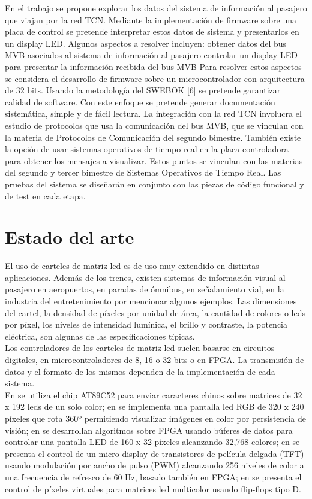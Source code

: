 En el trabajo se propone explorar los datos del sistema de información al pasajero que viajan por
la red TCN. Mediante la implementación de firmware sobre una placa de control se pretende
interpretar estos datos de sistema y presentarlos en un display LED. Algunos aspectos a resolver
incluyen:
obtener datos del bus MVB asociados al sistema de información al pasajero
controlar un display LED para presentar la información recibida del bus MVB
Para resolver estos aspectos se considera el desarrollo de firmware sobre un microcontrolador
con arquitectura de 32 bits. Usando la metodología del SWEBOK [6] se pretende garantizar
calidad de software. Con este enfoque se pretende generar documentación sistemática, simple y
de fácil lectura. La integración con la red TCN involucra el estudio de protocolos que usa la
comunicación del bus MVB, que se vinculan con la materia de Protocolos de Comunicación del
segundo bimestre. También existe la opción de usar sistemas operativos de tiempo real en la
placa controladora para obtener los mensajes a visualizar. Estos puntos se vinculan con las
materias del segundo y tercer bimestre de Sistemas Operativos de Tiempo Real. Las pruebas del
sistema se diseñarán en conjunto con las piezas de código funcional y de test en cada etapa.

\pagebreak
\section{Estado del arte}
El uso de carteles de matriz led es de uso muy extendido en distintas aplicaciones. Además de los trenes,  existen sistemas de información visual al pasajero en aeropuertos, en paradas de ómnibus, en señalamiento vial, en la industria del entretenimiento por mencionar algunos ejemplos. Las dimensiones del cartel, la densidad de píxeles por unidad de área, la cantidad de colores o leds por píxel, los niveles de intensidad lumínica, el brillo y contraste, la potencia eléctrica, son algunas de las especificaciones típicas.\\

 Los controladores de los carteles de matriz led suelen basarse en circuitos digitales, en microcontroladores de 8, 16 o 32 bits o en FPGA. La transmisión de datos y el formato de los mismos dependen de la implementación de cada sistema.  \\

En \cite{b1} se utiliza el chip AT89C52 para enviar caracteres chinos sobre matrices de 32 x 192 leds de un solo color; en \cite{b2} se implementa una pantalla led RGB de 320 x 240 píxeles que rota 360º permitiendo visualizar imágenes en color por persistencia de visión; en \cite{b3} se desarrollan algoritmos sobre FPGA usando búferes de datos para controlar una pantalla LED de 160 x 32 píxeles alcanzando 32,768 colores; en \cite{b4} se presenta el control de un micro display de transistores de película delgada (TFT) usando modulación por ancho de pulso (PWM) alcanzando 256 niveles de color a una frecuencia de refresco de 60 Hz, basado también en FPGA; en \cite{b5} se presenta el control de píxeles virtuales para matrices led multicolor usando flip-flops tipo D. \\

